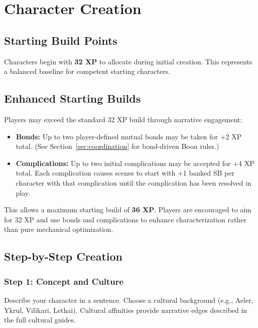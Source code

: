 
\section{Character Creation}

\subsection{Starting Build Points}

Characters begin with \textbf{32 XP} to allocate during initial creation. This represents a balanced baseline for competent starting characters.

\subsection{Enhanced Starting Builds}

Players may exceed the standard 32 XP build through narrative engagement:

\begin{itemize}
  \item \textbf{Bonds:} Up to two player-defined mutual bonds may be taken for +2 XP total. (See Section~\ref{sec:coordination} for bond-driven Boon rules.)
  \item \textbf{Complications:} Up to two initial complications may be accepted for +4 XP total. Each complication causes scenes to start with +1 banked SB per character with that complication until the complication has been resolved in play.
\end{itemize}

This allows a maximum starting build of \textbf{36 XP}. Players are encouraged to aim for 32 XP and use bonds and complications to enhance characterization rather than pure mechanical optimization.

\subsection{Step-by-Step Creation}

\subsubsection{Step 1: Concept and Culture}
Describe your character in a sentence. Choose a cultural background (e.g., Aeler, Ykrul, Vilikari, Lethai). Cultural affinities provide narrative edges described in the full cultural guides.

